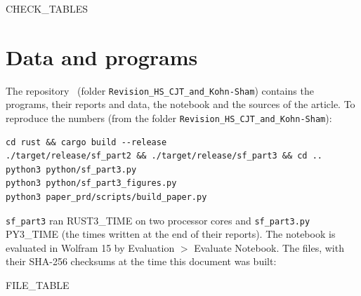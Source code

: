 \documentclass[aps,prd,onecolumn,superscriptaddress,nofootinbib,floatfix,longbibliography]{revtex4-2}
\begin{document}
{{CHECK_TABLES}}

\section{Data and programs}
\label{sec:data}

The repository~\cite{Repo} (folder \texttt{Revision\_HS\_CJT\_and\_Kohn-Sham}) contains the programs, their reports and data, the notebook
and the sources of the article. To reproduce the numbers (from the folder \texttt{Revision\_HS\_CJT\_and\_Kohn-Sham}):
\begin{verbatim}
cd rust && cargo build --release
./target/release/sf_part2 && ./target/release/sf_part3 && cd ..
python3 python/sf_part3.py
python3 python/sf_part3_figures.py
python3 paper_prd/scripts/build_paper.py
\end{verbatim}
\texttt{sf\_part3} ran {{RUST3_TIME}} on two processor cores and \texttt{sf\_part3.py} {{PY3_TIME}} (the times written at the end of their reports). The notebook is evaluated
in Wolfram 15 by Evaluation $>$ Evaluate Notebook. The files, with their SHA-256 checksums at the time this document was built:

{{FILE_TABLE}}


\end{document}
